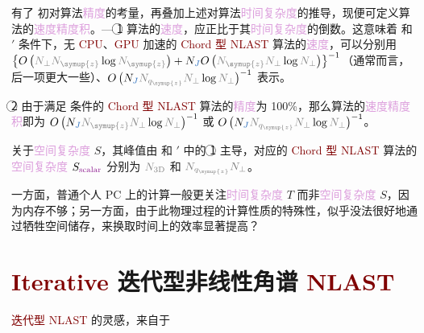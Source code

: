 有了  初对算法\textcolor{Plum}{精度}的考量，再叠加上述对算法\textcolor{Plum}{时间复杂度}的推导，现便可定义算法的\textcolor{Plum}{速度精度积}。--- \textcircled{1} 算法的\textcolor{Plum}{速度}，应正比于其\textcolor{Plum}{时间复杂度}的倒数。这意味着 {\two} 和 {\two}$'$ 条件下，无 \textcolor{Maroon}{CPU}、\textcolor{Maroon}{GPU} 加速的 \textcolor{Maroon}{Chord 型} \textcolor{Maroon}{NLAST} 算法的\textcolor{Plum}{速度}，可以分别用 $\left\{ O \left( \textcolor{gray}{N_\perp} \textcolor{gray}{N_{\symup{z}}} \log \textcolor{gray}{N_{\symup{z}}} \right) + N_{\textcolor{NavyBlue}{J}} O \left( \textcolor{gray}{N_{\symup{z}}} \textcolor{gray}{N_\perp} \log \textcolor{gray}{N_\perp} \right) \right\}^{-1}$（通常而言，后一项更大一些）、$O \left( N_{\textcolor{NavyBlue}{J}} \textcolor{gray}{N_{q_{\symup{z}}}} \textcolor{gray}{N_\perp} \log \textcolor{gray}{N_\perp} \right)^{-1}$ 表示。

\textcircled{2} 由于满足  条件的 \textcolor{Maroon}{Chord 型} \textcolor{Maroon}{NLAST} 算法的\textcolor{Plum}{精度}为 100\%，那么算法的\textcolor{Plum}{速度精度积}即为 $O \left( N_{\textcolor{NavyBlue}{J}} \textcolor{gray}{N_{\symup{z}}} \textcolor{gray}{N_\perp} \log \textcolor{gray}{N_\perp} \right)^{-1}$ 或 $O \left( N_{\textcolor{NavyBlue}{J}} \textcolor{gray}{N_{q_{\symup{z}}}} \textcolor{gray}{N_\perp} \log \textcolor{gray}{N_\perp} \right)^{-1}$。

关于\textcolor{Plum}{空间复杂度} $S$，其峰值由 {\two} 和 {\two}$'$ 中的 \textcircled{1} 主导，对应的 \textcolor{Maroon}{Chord 型} \textcolor{Maroon}{NLAST} 算法的\textcolor{Plum}{空间复杂度} $S_{\text{\textcolor{Plum}{scalar}}}$ 分别为 $\textcolor{gray}{N_{\text{3D}}}$ 和 $\textcolor{gray}{N_{q_{\symup{z}}}} \textcolor{gray}{N_\perp}$。

一方面，普通个人 PC 上的计算一般更关注\textcolor{Plum}{时间复杂度} $T$ 而非\textcolor{Plum}{空间复杂度} $S$，因为内存不够；另一方面，由于此物理过程的计算性质的特殊性，似乎没法很好地通过牺牲空间储存，来换取时间上的效率显著提高？

\section{\textcolor{Maroon}{Iterative} 迭代型非线性角谱 \textcolor{Maroon}{NLAST}}\label{sec:NLAST_iterate}

\textcolor{Maroon}{迭代型} \textcolor{Maroon}{NLAST} 的灵感，来自于

